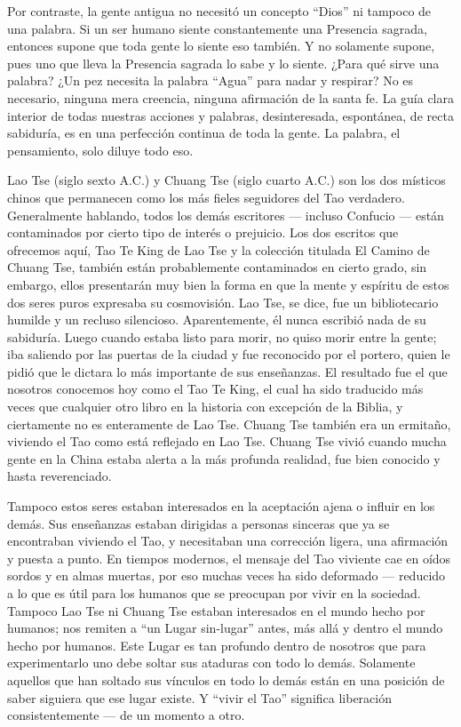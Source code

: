 \documentclass[hidelinks]{memoir}
\begin{document}
	Por contraste, la gente antigua no necesitó un concepto ``Dios'' ni
	tampoco de una palabra. Si un ser humano siente constantemente una
	Presencia sagrada, entonces supone que toda gente lo siente eso también.
	Y no solamente supone, pues uno que lleva la Presencia sagrada lo sabe y
	lo siente. ¿Para qué sirve una palabra? ¿Un pez necesita la palabra
	``Agua'' para nadar y respirar? No es necesario, ninguna mera creencia,
	ninguna afirmación de la santa fe. La guía clara interior de todas
	nuestras acciones y palabras, desinteresada, espontánea, de recta
	sabiduría, es en una perfección continua de toda la gente. La palabra,
	el pensamiento, solo diluye todo eso.
	
	Lao Tse (siglo sexto A.C.) y Chuang Tse (siglo cuarto A.C.) son los dos
	místicos chinos que permanecen como los más fieles seguidores del Tao
	verdadero. Generalmente hablando, todos los demás escritores --- incluso
	Confucio --- están contaminados por cierto tipo de interés o prejuicio.
	Los dos escritos que ofrecemos aquí, Tao Te King de Lao Tse y la
	colección titulada El Camino de Chuang Tse, también están probablemente
	contaminados en cierto grado, sin embargo, ellos presentarán muy bien la
	forma en que la mente y espíritu de estos dos seres puros expresaba su
	cosmovisión. Lao Tse, se dice, fue un bibliotecario humilde y un recluso
	silencioso. Aparentemente, él nunca escribió nada de su sabiduría. Luego
	cuando estaba listo para morir, no quiso morir entre la gente; iba
	saliendo por las puertas de la ciudad y fue reconocido por el portero,
	quien le pidió que le dictara lo más importante de sus enseñanzas. El
	resultado fue el que nosotros conocemos hoy como el Tao Te King, el cual
	ha sido traducido más veces que cualquier otro libro en la historia con
	excepción de la Biblia, y ciertamente no es enteramente de Lao Tse.
	Chuang Tse también era un ermitaño, viviendo el Tao como está reflejado
	en Lao Tse. Chuang Tse vivió cuando mucha gente en la China estaba
	alerta a la más profunda realidad, fue bien conocido y hasta
	reverenciado.
	
	Tampoco estos seres estaban interesados en la aceptación ajena o influir
	en los demás. Sus enseñanzas estaban dirigidas a personas sinceras que
	ya se encontraban viviendo el Tao, y necesitaban una corrección ligera,
	una afirmación y puesta a punto. En tiempos modernos, el mensaje del Tao
	viviente cae en oídos sordos y en almas muertas, por eso muchas veces ha
	sido deformado --- reducido a lo que es útil para los humanos que se
	preocupan por vivir en la sociedad. Tampoco Lao Tse ni Chuang Tse
	estaban interesados en el mundo hecho por humanos; nos remiten a ``un
	Lugar sin-lugar'' antes, más allá y dentro el mundo hecho por humanos.
	Este Lugar es tan profundo dentro de nosotros que para experimentarlo
	uno debe soltar sus ataduras con todo lo demás. Solamente aquellos que
	han soltado sus vínculos en todo lo demás están en una posición de saber
	siguiera que ese lugar existe. Y ``vivir el Tao'' significa liberación
	consistentemente --- de un momento a otro.
	
\end{document}
